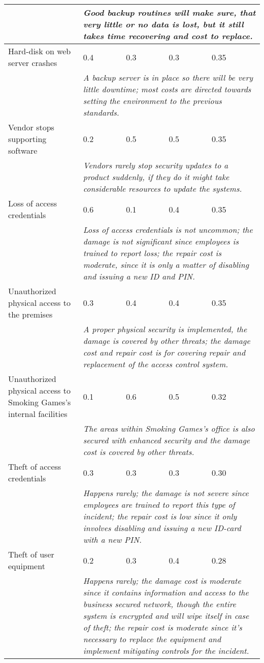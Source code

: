 \begin{longtable}{| p{4.2cm} | p{1.8cm} | p{1.8cm} | p{1.8cm} | p{1.8cm} |}
		& \multicolumn{4}{|p{8cm}|}{\textit{Good backup routines will make sure, that very little or no data is lost, but it still takes time recovering and cost to replace.}}\\\hline
		Hard-disk on web server crashes & 0.4 & 0.3 & 0.3 & 0.35\\\hline
		& \multicolumn{4}{|p{8cm}|}{\textit{A backup server is in place so there will be very little downtime; most costs are directed towards setting the environment to the previous standards.}}\\\hline
		Vendor stops supporting software & 0.2 & 0.5 & 0.5 & 0.35\\\hline
		& \multicolumn{4}{|p{8cm}|}{\textit{Vendors  rarely stop security updates to a product suddenly, if they do it might take considerable resources to update the systems.}}\\\hline
		Loss of access credentials & 0.6 & 0.1 & 0.4 & 0.35\\\hline
		& \multicolumn{4}{|p{8cm}|}{\textit{Loss of access credentials is not uncommon; the damage is not significant since employees is trained to report loss; the repair cost is moderate, since it is only a matter of disabling and issuing a new ID and PIN.}}\\\hline
		Unauthorized physical access to the premises & 0.3 & 0.4 & 0.4 & 0.35\\\hline
		& \multicolumn{4}{|p{8cm}|}{\textit{A proper physical security is implemented, the damage is covered by other threats; the damage cost and repair cost is for covering repair and replacement of the access control system.}}\\\hline
		Unauthorized physical access to Smoking Games's internal facilities & 0.1 & 0.6 & 0.5 & 0.32\\\hline
		& \multicolumn{4}{|p{8cm}|}{\textit{The areas within Smoking Games's office is also secured with enhanced security and the damage cost is covered by other threats.}}\\\hline
		Theft of access credentials & 0.3 & 0.3 & 0.3 & 0.30\\\hline
		& \multicolumn{4}{|p{8cm}|}{\textit{Happens rarely; the damage is not severe since employees are trained to report this type of incident; the repair cost is low since it only involves disabling and issuing a new ID-card with a new PIN.}}\\\hline
		Theft of user equipment & 0.2 & 0.3 & 0.4 & 0.28\\\hline
		& \multicolumn{4}{|p{8cm}|}{\textit{Happens rarely; the damage cost is moderate since it contains information and access to the business secured network, though the entire system is encrypted and will wipe itself in case of theft; the repair cost is moderate since it's necessary to replace the equipment and implement mitigating controls for the incident.}}\\\hline

\end{longtable}
